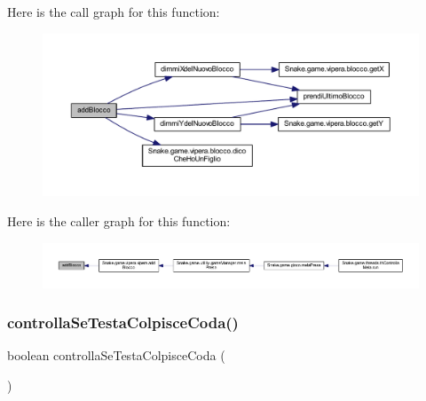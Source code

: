 Here is the call graph for this function\+:
\nopagebreak
\begin{figure}[H]
\begin{center}
\leavevmode
\includegraphics[width=350pt]{class_snake_1_1game_1_1vipera_1_1blocchi_aca08d818f8eb2849ca337ea2c64f344d_cgraph}
\end{center}
\end{figure}
Here is the caller graph for this function\+:
\nopagebreak
\begin{figure}[H]
\begin{center}
\leavevmode
\includegraphics[width=350pt]{class_snake_1_1game_1_1vipera_1_1blocchi_aca08d818f8eb2849ca337ea2c64f344d_icgraph}
\end{center}
\end{figure}
\mbox{\label{class_snake_1_1game_1_1vipera_1_1blocchi_a1437df7b6446c67e0385922e99343857}} 
\subsubsection{\texorpdfstring{controlla\+Se\+Testa\+Colpisce\+Coda()}{controllaSeTestaColpisceCoda()}}
{\footnotesize\ttfamily boolean controlla\+Se\+Testa\+Colpisce\+Coda (\begin{DoxyParamCaption}{ }\end{DoxyParamCaption})\hspace{0.3cm}{\ttfamily [private]}}



